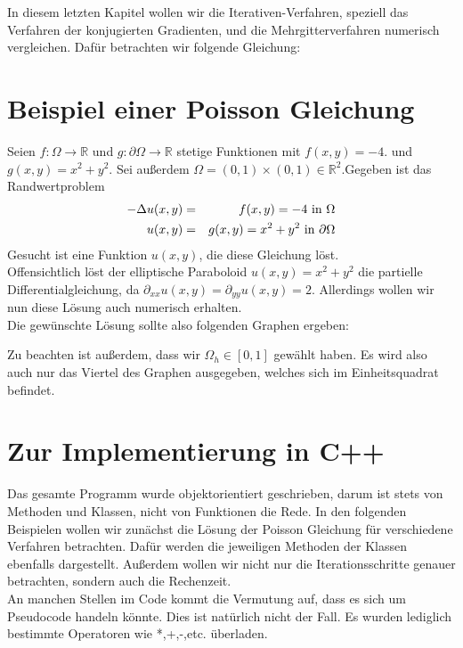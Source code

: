 In diesem letzten Kapitel wollen wir die Iterativen-Verfahren, speziell das Verfahren der konjugierten Gradienten, und die Mehrgitterverfahren numerisch vergleichen. Dafür betrachten wir folgende Gleichung:

\section{Beispiel einer Poisson Gleichung}\label{s.Beispiel einer Poisson Gleichung}

Seien $f: \Omega \rightarrow \mathbb{R}$ und $g: \partial\Omega \rightarrow \mathbb{R}$ stetige Funktionen mit $f(x,y) = -4.$ und $g(x,y) = x^{2} + y^{2}$. Sei außerdem $\Omega = (0,1)\times(0,1) \in \mathbb{R}^{2}$.Gegeben ist das Randwertproblem
\begin{eqnarray}
        -\Delta u(x,y) &=& f(x,y) = -4 \textnormal{ in } \Omega \\
    u(x,y) &=& g(x,y) = x^{2} + y^{2} \textnormal{ in } \partial \Omega
\end{eqnarray}
Gesucht ist eine Funktion $u(x,y)$, die diese Gleichung löst. \\
Offensichtlich löst der elliptische Paraboloid $u(x,y) = x^{2} + y^{2}$ die partielle Differentialgleichung, da $\partial_{xx}u(x,y) = \partial_{yy}u(x,y) = 2$. Allerdings wollen wir nun diese Lösung auch numerisch erhalten.\\
Die gewünschte Lösung sollte also folgenden Graphen ergeben:


Zu beachten ist außerdem, dass wir $\Omega_{h} \in [0,1]$ gewählt haben. Es wird also auch nur das Viertel des Graphen ausgegeben, welches sich im Einheitsquadrat befindet.\\

\section{Zur Implementierung in C++}

Das gesamte Programm wurde objektorientiert geschrieben, darum ist stets von Methoden und Klassen, nicht von Funktionen die Rede. In den folgenden Beispielen wollen wir zunächst die Lösung der Poisson Gleichung für verschiedene Verfahren betrachten. Dafür werden die jeweiligen Methoden der Klassen ebenfalls dargestellt. Außerdem wollen wir nicht nur die Iterationsschritte genauer betrachten, sondern auch die Rechenzeit.\\
An manchen Stellen im Code kommt die Vermutung auf, dass es sich um Pseudocode handeln könnte. Dies ist natürlich nicht der Fall. Es wurden lediglich bestimmte Operatoren wie *,+,-,etc. überladen.

